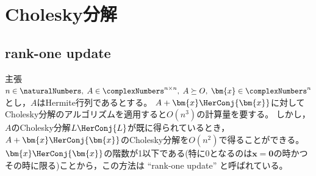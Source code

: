 \chapter{Cholesky分解}
    \section{rank-one update}
        \begin{itembox}[l]{主張}
            $n\in\naturalNumbers,\;A\in\complexNumbers^{n\times n},\;A\succeq O,\;\bm{x}\in\complexNumbers^n$とし，$A$はHermite行列であるとする。
            $A+\bm{x}\HerConj{\bm{x}}$に対してCholesky分解のアルゴリズムを適用すると$O(n^3)$の計算量を要する。
            しかし，$A$のCholesky分解$L\HerConj{L}$が既に得られているとき，$A+\bm{x}\HerConj{\bm{x}}$のCholesky分解を$O(n^2)$で得ることができる。
            $\bm{x}\HerConj{\bm{x}}$の階数が1以下である(特に0となるのは$\bm{x}=\bm{0}$の時かつその時に限る)ことから，この方法は ``rank-one update'' と呼ばれている。
        \end{itembox}
